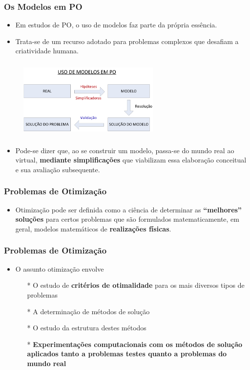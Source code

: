 \documentclass{beamer}
\begin{document}
\begin{frame}
	\frametitle{Os Modelos em PO}
	\begin{itemize}
	\item Em estudos de PO, o uso de modelos faz parte da própria essência.
	\item Trata-se de um recurso adotado para problemas complexos que desafiam a criatividade humana.
	\end{itemize}
	\begin{figure}
		\includegraphics[width=7cm, height=4cm]{modelosPO.png}
	\end{figure}	
	\begin{itemize}
	\item Pode-se dizer que, ao se construir um modelo, passa-se do mundo real ao virtual, \textbf{\color{red}mediante simplificações} que viabilizam essa elaboração conceitual e sua avaliação subsequente.
	\end{itemize}
\end{frame}

\begin{frame}	
	\frametitle{Problemas de Otimização}
	\begin{itemize}
	\item Otimização pode ser definida como a ciência de determinar as \textbf{\color{red}“melhores” soluções} para certos problemas que são formulados matematicamente, em geral, modelos matemáticos de \textbf{\color{red}realizações físicas}.
	\end{itemize}
\end{frame}

\begin{frame}
	\frametitle{Problemas de Otimização}
	\begin{itemize}
	\item {O assunto otimização envolve}
		\begin{itemize}
		\item[*] O estudo de \textbf{\color{red}critérios de otimalidade} para os mais diversos tipos de problemas
		\item[*] A determinação de métodos de solução
		\item[*] O estudo da estrutura destes métodos
		\item[*] \textbf{\color{red}Experimentações computacionais com os métodos de solução aplicados tanto a problemas testes quanto a problemas do mundo real}
		\end{itemize}
	\end{itemize}
\end{frame}
\end{document}
